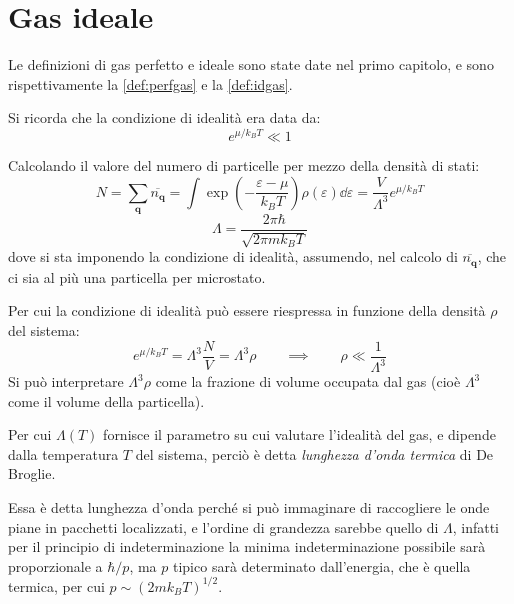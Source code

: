 
\section{Gas ideale}
\label{sec:idgas}

Le definizioni di gas perfetto e ideale sono state date nel primo capitolo, e sono rispettivamente la \cref{def:perfgas} e la \cref{def:idgas}.

Si ricorda che la condizione di idealità era data da:
\begin{equation*}
e^{\mu/k_B T} \ll 1
\end{equation*}

Calcolando il valore del numero di particelle per mezzo della densità di stati:
\begin{equation*}
N = \sum_{\textbf{q}} \overline{n_{\textbf{q}}} = \int \exp \left(- \frac{\varepsilon - \mu}{k_B T}\right) \rho(\varepsilon) \dd \varepsilon = \frac{V}{\Lambda^3} e^{\mu/k_B T}
\end{equation*}
\begin{equation*}
\Lambda = \frac{2\pi \hbar}{\sqrt{2\pi m k_B T}}
\end{equation*}
dove si sta imponendo la condizione di idealità, assumendo, nel calcolo di $ \overline{n_{\textbf{q}}} $, che ci sia al più una particella per microstato.

Per cui la condizione di idealità può essere riespressa in funzione della densità $\rho$ del sistema:
\begin{equation*}
	e^{\mu/k_B T} = \Lambda^3 \frac{N}{V} = \Lambda^3 \rho	\qquad \implies \qquad \rho \ll \frac{1}{\Lambda^3}
\end{equation*}
Si può interpretare $ \Lambda^3 \rho $ come la frazione di volume occupata dal gas (cioè $ \Lambda^3 $ come il volume della particella).

Per cui $\Lambda(T)$ fornisce il parametro su cui valutare l'idealità del gas, e dipende dalla temperatura $T$ del sistema, perciò è detta \textit{lunghezza d'onda termica} di De Broglie.

Essa è detta lunghezza d'onda perché si può immaginare di raccogliere le onde piane in pacchetti localizzati, e l'ordine di grandezza sarebbe quello di $\Lambda$, infatti per il principio di indeterminazione la minima indeterminazione possibile sarà proporzionale a $\hbar/p$, ma $p$ tipico sarà determinato dall'energia, che è quella termica, per cui $p \sim (2 m k_B T)^{1/2}$.


